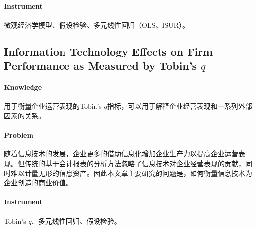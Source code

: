 \documentclass{article}
\begin{document}
    \paragraph*{Instrument} 微观经济学模型、假设检验、多元线性回归（OLS、ISUR）。

    \subsection*{Information Technology Effects on Firm Performance as Measured by Tobin's $q$}

    \paragraph*{Knowledge} 用于衡量企业运营表现的Tobin's $q$指标，可以用于解释企业经营表现和一系列外部因素的关系。
    \paragraph*{Problem} 随着信息技术的发展，企业更多的借助信息化增加企业生产力以提高企业运营表现。但传统的基于会计报表的分析方法忽略了信息技术对企业经营表现的贡献，同时难以计量无形的信息资产。因此本文章主要研究的问题是，如何衡量信息技术为企业创造的商业价值。
    \paragraph*{Instrument} Tobin's $q$、多元线性回归、假设检验。
\end{document}
